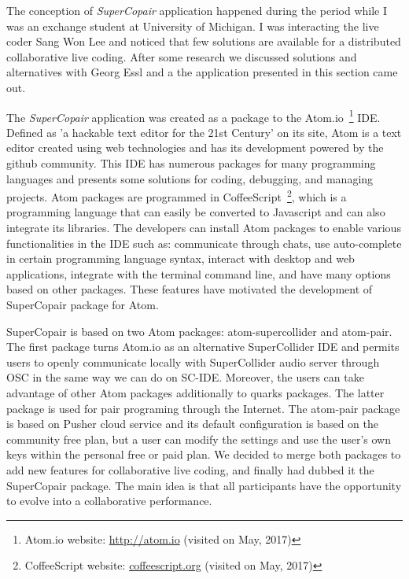 The conception of \textit{SuperCopair} application happened during the period while I was an exchange student at University of Michigan.
I was interacting the live coder Sang Won Lee and noticed that few solutions are available for a distributed collaborative live coding.
After some research we discussed solutions and alternatives with Georg Essl and a the application presented in this section came out.

The \textit{SuperCopair} application was created as a package to the Atom.io~\footnote{Atom.io website: \url{http://atom.io} (visited on May, 2017)} IDE.
Defined as 'a hackable text editor for the 21st Century' on its site, Atom is a text editor created using web technologies and has its development powered by the github community.
This IDE has numerous packages for many programming languages and presents some solutions for coding, debugging, and managing projects.
Atom packages are programmed in CoffeeScript~\footnote{CoffeeScript website: \url{coffeescript.org} (visited on May, 2017)}, which is a programming language that can easily be converted to Javascript and can also integrate its libraries.
The developers can install Atom packages to enable various functionalities in the IDE such as: communicate through chats, use auto-complete in certain programming language syntax, interact with desktop and web applications, integrate with the terminal command line, and have many options based on other packages.
These features have motivated the development of SuperCopair package for Atom.

SuperCopair is based on two Atom packages: atom-supercollider and atom-pair.
The first package turns Atom.io as an alternative SuperCollider IDE and permits users to openly communicate locally with SuperCollider audio server through OSC in the same way we can do on SC-IDE.
Moreover, the users can take advantage of other Atom packages additionally to quarks packages.
The latter package is used for pair programing through the Internet.
The atom-pair package is based on Pusher cloud service and its default configuration is based on the community free plan, but a user can modify the settings and use the user’s own keys within the personal free or paid plan. 
We decided to merge both packages to add new features for collaborative live coding, and finally had dubbed it the SuperCopair package.
The main idea is that all participants have the opportunity to evolve into a collaborative performance.

